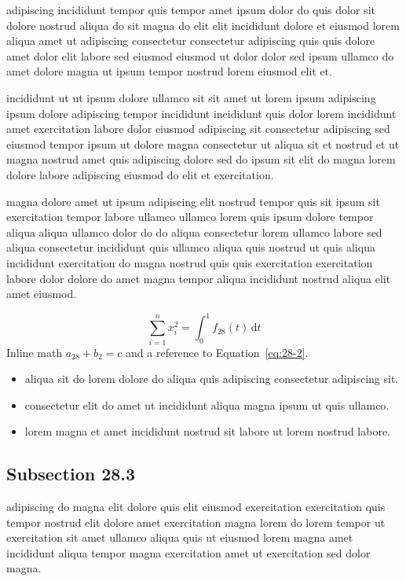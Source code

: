 \documentclass{article}
\begin{document}
adipiscing incididunt tempor quis tempor amet ipsum dolor do quis dolor sit dolore nostrud aliqua do sit magna do elit elit incididunt dolore et eiusmod lorem aliqua amet ut adipiscing consectetur consectetur adipiscing quis quis dolore amet dolor elit labore sed eiusmod eiusmod ut dolor dolor sed ipsum ullamco do amet dolore magna ut ipsum tempor nostrud lorem eiusmod elit et.

incididunt ut ut ipsum dolore ullamco sit sit amet ut lorem ipsum adipiscing ipsum dolore adipiscing tempor incididunt incididunt quis dolor lorem incididunt amet exercitation labore dolor eiusmod adipiscing sit consectetur adipiscing sed eiusmod tempor ipsum ut dolore magna consectetur ut aliqua sit et nostrud et ut magna nostrud amet quis adipiscing dolore sed do ipsum sit elit do magna lorem dolore labore adipiscing eiusmod do elit et exercitation.

magna dolore amet ut ipsum adipiscing elit nostrud tempor quis sit ipsum sit exercitation tempor labore ullamco ullamco lorem quis ipsum dolore tempor aliqua aliqua ullamco dolor do do aliqua consectetur lorem ullamco labore sed aliqua consectetur incididunt quis ullamco aliqua quis nostrud ut quis aliqua incididunt exercitation do magna nostrud quis quis exercitation exercitation labore dolor dolore do amet magna tempor aliqua incididunt nostrud aliqua elit amet eiusmod.

\begin{equation}\label{eq:28-2}
  \sum_{i=1}^{n} x_i^{2} = \int_0^1 f_{28}(t)\,\mathrm{d}t
\end{equation}
Inline math $a_{28} + b_{2} = c$ and a reference to Equation~\eqref{eq:28-2}.

\begin{itemize}
  \item aliqua sit do lorem dolore do aliqua quis adipiscing consectetur adipiscing sit.
  \item consectetur elit do amet ut incididunt aliqua magna ipsum ut quis ullamco.
  \item lorem magna et amet incididunt nostrud sit labore ut lorem nostrud labore.
\end{itemize}

\subsection{Subsection 28.3}\label{sec:28-3}
adipiscing do magna elit dolore quis elit eiusmod exercitation exercitation quis tempor nostrud elit dolore amet exercitation magna lorem do lorem tempor ut exercitation sit amet ullamco aliqua quis ut eiusmod lorem magna amet incididunt aliqua tempor magna exercitation amet ut exercitation sed dolor magna.
\end{document}
